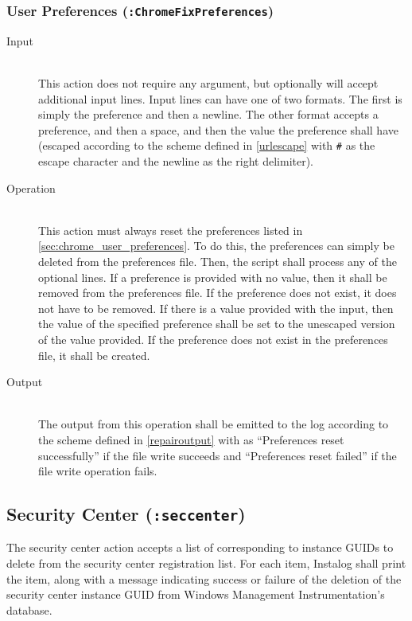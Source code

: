\subsubsection{User Preferences (\texttt{:ChromeFixPreferences})}
\begin{description}
\item[Input] \hfill \\
This action does not require any argument, but optionally will accept additional
input lines.  Input lines can have one of two formats.  The first is simply the
preference and then a newline.  The other format accepts a preference, and then
a space, and then the value the preference shall have (escaped according to
the scheme defined in \ref{urlescape} with \verb|#| as the escape character and
the newline as the right delimiter). 
\item[Operation] \hfill \\
This action must always reset the preferences listed in
\ref{sec:chrome_user_preferences}.  To do this, the preferences can simply be
deleted from the preferences file.  Then, the
script shall process any of the optional lines.  If a preference is provided
with no value, then it shall be removed from the preferences file.  If the
preference does not exist, it does not have to be removed.  If there is a value
provided with the input, then the value of the specified preference shall be
set to the unescaped version of the value provided.  If the preference does not
exist in the preferences file, it shall be created.
\item[Output] \hfill \\
The output from this operation shall be emitted to the log according to the
scheme defined in \ref{repairoutput} with  as ``Preferences reset
successfully'' if the file write succeeds and ``Preferences reset failed'' if
the file write operation fails.
\end{description} 

\subsection{Security Center (\texttt{:seccenter})}
The security center action accepts a list of  corresponding to
instance GUIDs to delete from the security center registration list. For each
item, Instalog shall print the item, along with a message indicating success or
failure of the deletion of the security center instance GUID from Windows
Management Instrumentation's database.


